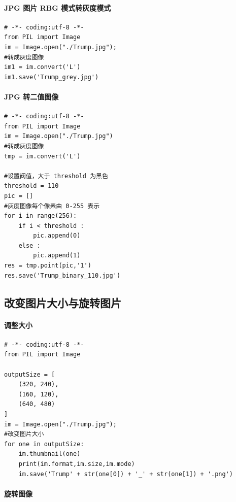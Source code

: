 \documentclass[11pt]{ctexart}
\begin{document}
\paragraph{JPG 图片 RBG 模式转灰度模式}

\lstset{language=python}
\begin{lstlisting}
# -*- coding:utf-8 -*-
from PIL import Image
im = Image.open("./Trump.jpg");
#转成灰度图像
im1 = im.convert('L') 
im1.save('Trump_grey.jpg')
\end{lstlisting}

\paragraph{JPG 转二值图像}

\lstset{language=python}
\begin{lstlisting}
# -*- coding:utf-8 -*-
from PIL import Image
im = Image.open("./Trump.jpg")
#转成灰度图像
tmp = im.convert('L')

#设置阀值，大于 threshold 为黑色
threshold = 110
pic = []
#灰度图像每个像素由 0-255 表示
for i in range(256):
    if i < threshold :
        pic.append(0)
    else :
        pic.append(1)
res = tmp.point(pic,'1')
res.save('Trump_binary_110.jpg')
\end{lstlisting}

\subsection{改变图片大小与旋转图片}

\paragraph{调整大小}

\lstset{language=python}
\begin{lstlisting}
# -*- coding:utf-8 -*-
from PIL import Image

outputSize = [
    (320, 240),
    (160, 120),
    (640, 480)
]
im = Image.open("./Trump.jpg");
#改变图片大小
for one in outputSize:
    im.thumbnail(one)
    print(im.format,im.size,im.mode)
    im.save('Trump' + str(one[0]) + '_' + str(one[1]) + '.png')

\end{lstlisting}

\paragraph{旋转图像}
\end{document}
